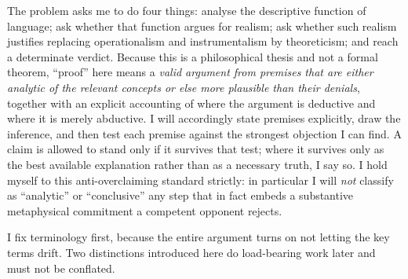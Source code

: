 \documentclass[12pt]{article}
\begin{document}
The problem asks me to do four things: analyse the descriptive function
of language; ask whether that function argues for realism; ask whether
such realism justifies replacing operationalism and instrumentalism by
theoreticism; and reach a determinate verdict. Because this is a
philosophical thesis and not a formal theorem, ``proof'' here means a
\emph{valid argument from premises that are either analytic of the
relevant concepts or else more plausible than their denials}, together
with an explicit accounting of where the argument is deductive and where
it is merely abductive. I will accordingly state premises explicitly,
draw the inference, and then test each premise against the strongest
objection I can find. A claim is allowed to stand only if it survives
that test; where it survives only as the best available explanation
rather than as a necessary truth, I say so. I hold myself to this
anti-overclaiming standard strictly: in particular I will \emph{not}
classify as ``analytic'' or ``conclusive'' any step that in fact embeds a
substantive metaphysical commitment a competent opponent rejects.

I fix terminology first, because the entire argument turns on not letting
the key terms drift. Two distinctions introduced here do load-bearing
work later and must not be conflated.
\end{document}
